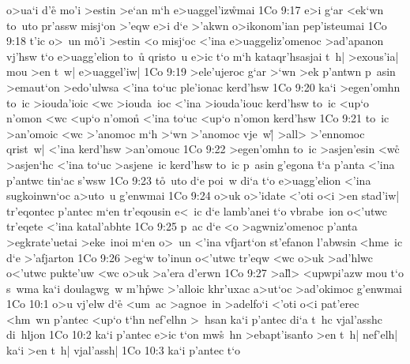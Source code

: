o>ua`i
d'e\r{}
mo'i
>estin
>e`an
m`h
e>uaggel'iz\r{w}mai\bibvsend
{}
\vs 1Co 9:17
e>i
g`ar
<ek`wn
to~uto
pr'assw
misj`on
>'eqw
e>i
d`e
>'akwn
o>ikonom'ian
pep'isteumai\bibvsend
\vs 1Co 9:18
t'ic
o>~un
m\r{o}'i
>estin
<o
misj`oc
<'ina
e>uaggeliz'omenoc
>ad'apanon
vj'hsw
t`o
e>uagg'elion
to~u\r{}
qristo~u
e>ic
t`o
m`h
kataqr'hsasjai
t~h|
>exous'ia|
mou
>en
t~w|
e>uaggel'iw|\bibvsend
\vs 1Co 9:19
>ele'ujeroc
g`ar
>`wn
>ek
p'antwn
p~asin
>emaut`on
>edo'ulwsa
<'ina
to`uc
ple'ionac
kerd'hsw\bibvsend
\vs 1Co 9:20
ka`i
>egen'omhn
to~ic
>iouda'ioic
<wc
>iouda~ioc
<'ina
>iouda'iouc
kerd'hsw
to~ic
<up`o
n'omon
<wc
<up`o
n'omo\r{n}
<'ina
to`uc
<up`o
n'omon
kerd'hsw\bibvsend
\vs 1Co 9:21
to~ic
>an'omoic
<wc
>'anomoc
m`h
>`wn
>'anomoc
vje~w|\r{}
>all>
>'ennomoc
qrist~w|
<'ina
kerd'hsw
>an'omouc\bibvsend
\vs 1Co 9:22
>egen'omhn
to~ic
>asjen'esin
<w\r{c}
>asjen`hc
<'ina
to`uc
>asjene~ic
kerd'hsw
to~ic
p~asin
g'egona
\r{t}`a
p'anta
<'ina
p'antwc
tin`ac
s'wsw\bibvsend
\vs 1Co 9:23
t\r{o}~uto
d`e
poi~w
di`a
t`o
e>uagg'elion
<'ina
sugkoinwn`oc
a>uto~u
g'enwmai\bibvsend
\vs 1Co 9:24
o>uk
o>'idate
<'oti
o<i
>en
stad'iw|
tr'eqontec
p'antec
m`en
tr'eqousin
e<~ic
d`e
lamb'anei
t`o
vbrabe~ion
o<'utwc
tr'eqete
<'ina
katal'abhte\bibvsend
\vs 1Co 9:25
p~ac
d`e
<o
>agwniz'omenoc
p'anta
>egkrate'uetai
>eke~inoi
m`en
o>~un
<'ina
vfjart`on
st'efanon
l'abwsin
<hme~ic
d`e
>'afjarton\bibvsend
\vs 1Co 9:26
>eg`w
to'inun
o<'utwc
tr'eqw
<wc
o>uk
>ad'hlwc
o<'utwc
pukte'uw
<wc
o>uk
>a'era
d'erwn\bibvsend
\vs 1Co 9:27
>al\r{l}>
<upwpi'azw
mou
t`o
s~wma
ka`i
doulagwg~w
m'h\r{p}wc
>'alloic
khr'uxac
a>ut`oc
>ad'okimoc
g'enwmai\bibvsend
\vs 1Co 10:1
o>u
vj'elw
d`e\r{}
<um~ac
>agnoe~in
>adelfo`i
<'oti
o<i
pat'erec
<hm~wn
p'antec
<up`o
t`hn
nef'elhn
>~hsan
ka`i
p'antec
di`a
t~hc
vjal'asshc
di~hljon\bibvsend
\vs 1Co 10:2
ka`i
p'antec
e>ic
t`on
mw\r{s}~hn
>ebapt'isan\r{t}o
>en
t~h|
nef'elh|
ka`i
>en
t~h|
vjal'assh|\bibvsend
\vs 1Co 10:3
ka`i
p'antec
t`o

